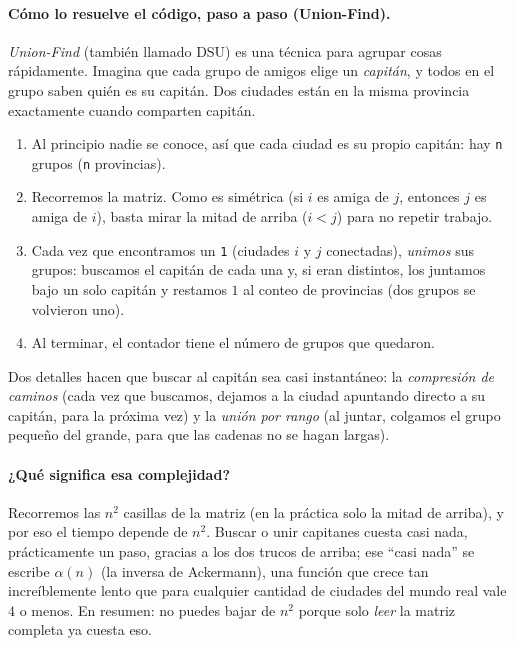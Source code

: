 \paragraph{Cómo lo resuelve el código, paso a paso (Union-Find).}
\emph{Union-Find} (también llamado DSU) es una técnica para agrupar cosas
rápidamente. Imagina que cada grupo de amigos elige un \emph{capitán}, y
todos en el grupo saben quién es su capitán. Dos ciudades están en la misma
provincia exactamente cuando comparten capitán.
\begin{enumerate}
  \item Al principio nadie se conoce, así que cada ciudad es su propio
        capitán: hay \texttt{n} grupos (\texttt{n} provincias).
  \item Recorremos la matriz. Como es simétrica (si $i$ es amiga de $j$,
        entonces $j$ es amiga de $i$), basta mirar la mitad de arriba
        ($i < j$) para no repetir trabajo.
  \item Cada vez que encontramos un \texttt{1} (ciudades $i$ y $j$
        conectadas), \emph{unimos} sus grupos: buscamos el capitán de cada
        una y, si eran distintos, los juntamos bajo un solo capitán y
        restamos $1$ al conteo de provincias (dos grupos se volvieron uno).
  \item Al terminar, el contador tiene el número de grupos que quedaron.
\end{enumerate}
Dos detalles hacen que buscar al capitán sea casi instantáneo: la
\emph{compresión de caminos} (cada vez que buscamos, dejamos a la ciudad
apuntando directo a su capitán, para la próxima vez) y la \emph{unión por
rango} (al juntar, colgamos el grupo pequeño del grande, para que las
cadenas no se hagan largas).




\paragraph{¿Qué significa esa complejidad?} Recorremos las $n^2$ casillas
de la matriz (en la práctica solo la mitad de arriba), y por eso el tiempo
depende de $n^2$. Buscar o unir capitanes cuesta casi nada, prácticamente
un paso, gracias a los dos trucos de arriba; ese ``casi nada'' se escribe
$\alpha(n)$ (la inversa de Ackermann), una función que crece tan
increíblemente lento que para cualquier cantidad de ciudades del mundo real
vale $4$ o menos. En resumen: no puedes bajar de $n^2$ porque solo
\emph{leer} la matriz completa ya cuesta eso.


